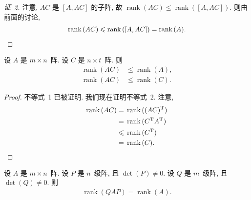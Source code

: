 \documentclass[../libro.tex]{subfiles}
\begin{document}
\begin{proof}[证~2]
    注意, \(AC\) 是 \([A, AC]\) 的子阵,
    故 \(\operatorname{rank} {(AC)}
    \leq \operatorname{rank} {([A, AC])}\).
    则由前面的讨论,
    \begin{equation*}
        \operatorname{rank} {(AC)}
        \leq \operatorname{rank} {([A, AC])}
        = \operatorname{rank} {(A)}.
        \qedhere
    \end{equation*}
\end{proof}

\begin{theorem}
    设 \(A\) 是 \(m \times n\)~阵.
    设 \(C\) 是 \(n \times t\)~阵.
    则
    \begin{align*}
        \operatorname{rank} {(AC)}
        & \leq \operatorname{rank} {(A)}, \\
        \operatorname{rank} {(AC)}
        & \leq \operatorname{rank} {(C)}.
    \end{align*}
\end{theorem}

\begin{proof}
    不等式~1 已被证明.
    我们现在证明不等式~2.
    注意,
    \begin{align*}
        \operatorname{rank} {(AC)}
        = {} &
        \operatorname{rank} {((AC)^{\mathrm{T}})}
        \\
        = {} &
        \operatorname{rank} {(C^{\mathrm{T}} A^{\mathrm{T}})}
        \\
        \leq {} &
        \operatorname{rank} {(C^{\mathrm{T}})}
        \\
        = {} &
        \operatorname{rank} {(C)}.
        \qedhere
    \end{align*}
\end{proof}

\begin{theorem}
    设 \(A\) 是 \(m \times n\)~阵.
    设 \(P\) 是 \(n\)~级阵, 且 \(\det {(P)} \neq 0\).
    设 \(Q\) 是 \(m\)~级阵, 且 \(\det {(Q)} \neq 0\).
    则
    \begin{align*}
        \operatorname{rank} {(QAP)}
        = \operatorname{rank} {(A)}.
    \end{align*}
\end{theorem}
\end{document}

